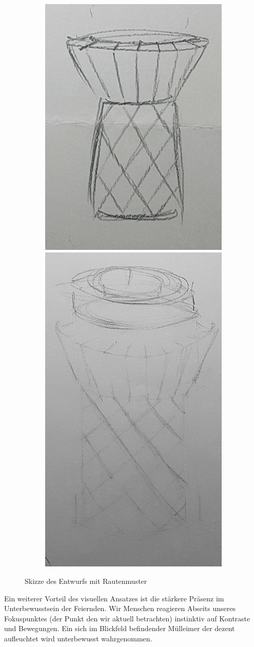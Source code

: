     \begin{figure}[H]
        \centering
        \begin{subfigure}[b]{\textwidth}
            \centering
            \includegraphics[width=0.32\linewidth]{media/01_project/pencil_sketch_bin_2.jpg}
            \hspace{1cm}
            \includegraphics[width=0.32\linewidth]{media/01_project/pencil_sketch_bin_3.jpg}
        \end{subfigure}
        \caption{Skizze des Entwurfs mit Rautenmuster}
        \label{fig:pencil_bin_2}
    \end{figure}

    Ein weiterer Vorteil des visuellen Ansatzes ist die stärkere Präsenz im Unterbewusstsein der Feiernden. Wir Menschen reagieren Abseits unseres Fokuspunktes (der Punkt den wir aktuell betrachten) instinktiv auf Kontraste und Bewegungen. Ein sich im Blickfeld befindender Mülleimer der dezent aufleuchtet wird unterbewusst wahrgenommen.

